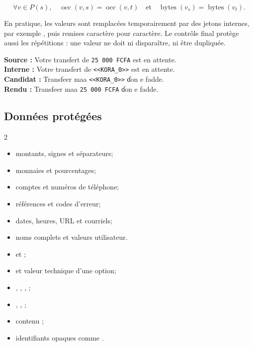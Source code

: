 \[
  \forall v \in P(s),\quad
  \operatorname{occ}(v,s)=\operatorname{occ}(v,t)
  \quad\text{et}\quad
  \operatorname{bytes}(v_s)=\operatorname{bytes}(v_t).
\]

En pratique, les valeurs sont remplacées temporairement par des jetons
internes, par exemple , puis remises caractère pour caractère.
Le contrôle final protège aussi les répétitions : une valeur ne doit ni
disparaître, ni être dupliquée.

\begin{keybox}
\textbf{Source :} Votre transfert de \texttt{25 000 FCFA} est en attente.\\
\textbf{Interne :} Votre transfert de \texttt{<<KORA\_0>>} est en attente.\\
\textbf{Candidat :} Transfeer maa \texttt{<<KORA\_0>>} ɗon e fadde.\\
\textbf{Rendu :} Transfeer maa \texttt{25 000 FCFA} ɗon e fadde.
\end{keybox}

\subsection{Données protégées}

\begin{multicols}{2}
\begin{itemize}
  \item montants, signes et séparateurs;
  \item monnaies et pourcentages;
  \item comptes et numéros de téléphone;
  \item références et codes d’erreur;
  \item dates, heures, URL et courriels;
  \item noms complets et valeurs utilisateur.
\end{itemize}

\columnbreak
\begin{itemize}
  \item {} et ;
  \item {} et valeur technique d’une option;
  \item {}, , , ;
  \item {}, , ;
  \item contenu ;
  \item identifiants opaques comme .
\end{itemize}
\end{multicols}

